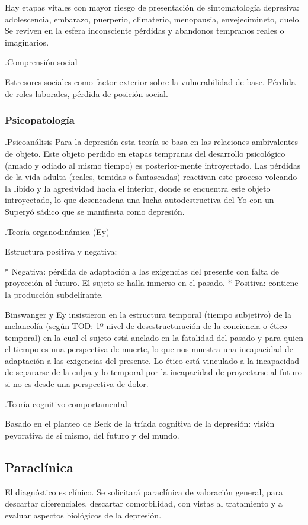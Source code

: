 \documentclass{scrbook}
\begin{document}
Hay etapas vitales con mayor riesgo de presentación de sintomatología depresiva: adolescencia, embarazo, puerperio, climaterio, menopausia, envejecimineto, duelo. Se reviven en la esfera inconsciente pérdidas y abandonos tempranos reales o imaginarios.

.Comprensión social

Estresores sociales como factor exterior sobre la vulnerabilidad de base. Pérdida de roles laborales, pérdida de posición social.
\subsubsection*{Psicopatología}
.Psicoanálisis
Para la depresión esta teoría se basa en las relaciones ambivalentes de objeto. Este objeto perdido en etapas tempranas del desarrollo psicológico (amado y odiado al mismo tiempo) es posterior-mente introyectado. Las pérdidas de la vida adulta (reales, temidas o fantaseadas) reactivan este proceso volcando la libido y la agresividad hacia el interior, donde se encuentra este objeto introyectado, lo que desencadena una lucha autodestructiva del Yo con un Superyó sádico que se manifiesta como depresión.

.Teoría organodinámica (Ey)

Estructura positiva y negativa:

* Negativa: pérdida de adaptación a las exigencias del presente con falta de proyección al futuro. El sujeto se halla inmerso en el pasado.
* Positiva: contiene la producción subdelirante.

Binswanger y Ey insistieron en la estructura temporal (tiempo subjetivo) de la melancolía (según TOD: 1º nivel de desestructuración de la conciencia o ético-temporal) en la cual el sujeto está anclado en la fatalidad del pasado y para quien el tiempo es una perspectiva de muerte, lo que nos muestra una incapacidad de adaptación a las exigencias del presente. Lo ético está vinculado a la incapacidad de separarse de la culpa y lo temporal por la incapacidad de proyectarse al futuro si no es desde una perspectiva de dolor.

.Teoría cognitivo-comportamental

Basado en el planteo de Beck de la tríada cognitiva de la depresión: visión peyorativa de sí mismo, del futuro y del mundo.
\subsection*{Paraclínica}
El diagnóstico es clínico. Se solicitará paraclínica de valoración general, para descartar diferenciales, descartar comorbilidad, con vistas al tratamiento y a evaluar aspectos biológicos de la depresión.
\end{document}
